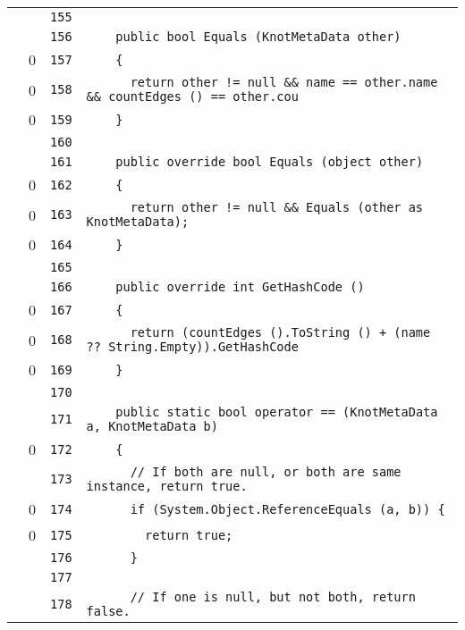 \documentclass[a4paper,10pt]{article}
\begin{document}
\begin{longtable}[l]{lrrl}
\cellcolor{gray} &  & \verb~155~ & \verb~~\\
\cellcolor{gray} &  & \verb~156~ & \verb~    public bool Equals (KnotMetaData other)~\\
\cellcolor{red} & 0 & \verb~157~ & \verb~    {~\\
\cellcolor{red} & 0 & \verb~158~ & \verb~      return other != null && name == other.name && countEdges () == other.cou~\\
\cellcolor{red} & 0 & \verb~159~ & \verb~    }~\\
\cellcolor{gray} &  & \verb~160~ & \verb~~\\
\cellcolor{gray} &  & \verb~161~ & \verb~    public override bool Equals (object other)~\\
\cellcolor{red} & 0 & \verb~162~ & \verb~    {~\\
\cellcolor{red} & 0 & \verb~163~ & \verb~      return other != null && Equals (other as KnotMetaData);~\\
\cellcolor{red} & 0 & \verb~164~ & \verb~    }~\\
\cellcolor{gray} &  & \verb~165~ & \verb~~\\
\cellcolor{gray} &  & \verb~166~ & \verb~    public override int GetHashCode ()~\\
\cellcolor{red} & 0 & \verb~167~ & \verb~    {~\\
\cellcolor{red} & 0 & \verb~168~ & \verb~      return (countEdges ().ToString () + (name ?? String.Empty)).GetHashCode ~\\
\cellcolor{red} & 0 & \verb~169~ & \verb~    }~\\
\cellcolor{gray} &  & \verb~170~ & \verb~~\\
\cellcolor{gray} &  & \verb~171~ & \verb~    public static bool operator == (KnotMetaData a, KnotMetaData b)~\\
\cellcolor{red} & 0 & \verb~172~ & \verb~    {~\\
\cellcolor{gray} &  & \verb~173~ & \verb~      // If both are null, or both are same instance, return true.~\\
\cellcolor{red} & 0 & \verb~174~ & \verb~      if (System.Object.ReferenceEquals (a, b)) {~\\
\cellcolor{red} & 0 & \verb~175~ & \verb~        return true;~\\
\cellcolor{gray} &  & \verb~176~ & \verb~      }~\\
\cellcolor{gray} &  & \verb~177~ & \verb~~\\
\cellcolor{gray} &  & \verb~178~ & \verb~      // If one is null, but not both, return false.~\\

\end{longtable}
\end{document}

